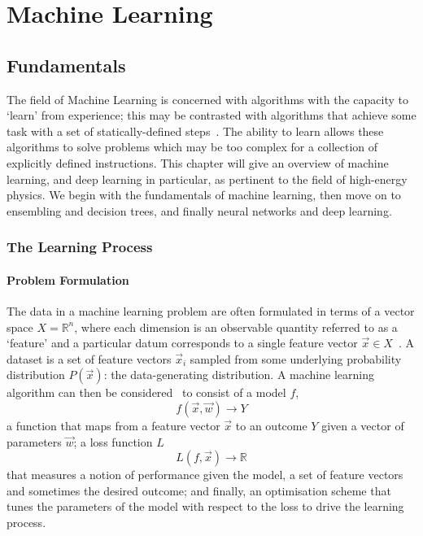 \chapter{Machine Learning}
\label{chap:machine_learning}



\section{Fundamentals}
The field of Machine Learning is concerned with algorithms with the capacity to `learn' from experience; this may be contrasted with algorithms that achieve some task with a set of statically-defined steps~\cite{DeepLearningBook}. The ability to learn allows these algorithms to solve problems which may be too complex for a collection of explicitly defined instructions. 
This chapter will give an overview of machine learning, and deep learning in particular, as pertinent to the field of high-energy physics. We begin with the fundamentals of machine learning, then move on to ensembling and decision trees, and finally neural networks and deep learning.  


\subsection{The Learning Process}

\subsubsection{Problem Formulation}
The data in a machine learning problem are often formulated in terms of a vector space $X = \mathds{R}^{n}$, where each dimension is an observable quantity referred to as a `feature' and a particular datum corresponds to a single feature vector $\vec{x} \in X$~\cite{elementsOfStatsLearning}. A dataset is a set of feature vectors $\vec{x}_{i}$ sampled from some underlying probability distribution $P(\vec{x})$: the data-generating distribution.
A machine learning algorithm can then be considered~\cite{elementsOfStatsLearning} to consist of a model $f$, 
\begin{equation}
    f(\vec{x},\vec{w})\rightarrow{Y}
\end{equation}
a function that maps from a feature vector $\vec{x}$ to an outcome $Y$ given a vector of parameters $\vec{w}$; a loss function $L$
\begin{equation}
    L(f,\vec{x})\rightarrow{\mathds{R}}
\end{equation}
that measures a notion of performance given the model, a set of feature vectors and sometimes the desired outcome; 
and finally, an optimisation scheme that tunes the parameters of the model with respect to the loss to drive the learning process.


